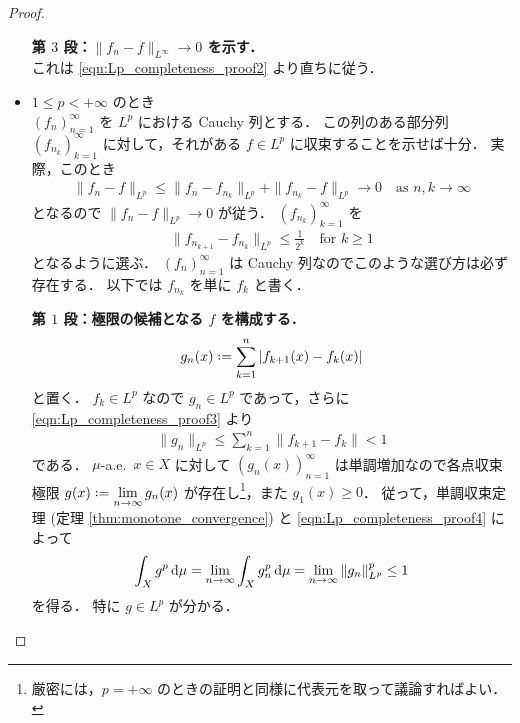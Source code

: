 \begin{proof}
\begin{itemize}[leftmargin=\parindent]
        \textbf{第 $3$ 段：$\|f_n-f\|_{L^\infty}\to0$ を示す．}\\
        これは \eqref{eqn:Lp_completeness_proof2} より直ちに従う．

    \item $1\le p<+\infty$ のとき\\
        $(f_n)_{n=1}^\infty$ を $L^p$ における Cauchy 列とする．
        この列のある部分列 $(f_{n_k})_{k=1}^\infty$ に対して，それがある $f\in L^p$ に収束することを示せば十分．
        実際，このとき
        \begin{align*}
            \|f_n-f\|_{L^p}
            \le\|f_n-f_{n_k}\|_{L^p}+\|f_{n_k}-f\|_{L^p}
            \to0\quad\text{as $n,k\to\infty$}
        \end{align*}
        となるので $\|f_n-f\|_{L^p}\to0$ が従う．
        $(f_{n_k})_{k=1}^\infty$ を
        \begin{align}
            \|f_{n_{k+1}}-f_{n_k}\|_{L^p}\le\frac{1}{2^k}\quad\text{for $k\ge1$}
            \label{eqn:Lp_completeness_proof3}
        \end{align}
        となるように選ぶ．
        $(f_n)_{n=1}^\infty$ は Cauchy 列なのでこのような選び方は必ず存在する．
        以下では $f_{n_k}$ を単に $f_k$ と書く．

        \textbf{第 $1$ 段：極限の候補となる $f$ を構成する．}
        \begin{align*}
            g_n(x)\defeq\sum_{k=1}^n|f_{k+1}(x)-f_k(x)|
        \end{align*}
        と置く．
        $f_k\in L^p$ なので $g_n\in L^p$ であって，さらに \eqref{eqn:Lp_completeness_proof3} より
        \begin{align}
            \|g_n\|_{L^p}\le\sum_{k=1}^n\|f_{k+1}-f_k\|<1
            \label{eqn:Lp_completeness_proof4}
        \end{align}
        である．
        $\mu$-a.e.\ $x\in X$ に対して $(g_n(x))_{n=1}^\infty$ は単調増加なので各点収束極限
        $\displaystyle g(x)\defeq\lim_{n\to\infty}g_n(x)$ が存在し\footnote{
            厳密には，$p=+\infty$ のときの証明と同様に代表元を取って議論すればよい．
        }，また $g_1(x)\ge0$．
        従って，単調収束定理 (定理 \ref{thm:monotone_convergence}) と \eqref{eqn:Lp_completeness_proof4} によって
        \begin{align*}
            \int_Xg^p\,\mathrm{d}\mu
            =\lim_{n\to\infty}\int_Xg_n^p\,\mathrm{d}\mu
            =\lim_{n\to\infty}\|g_n\|_{L^p}^p
            \le1
        \end{align*}
        を得る．
        特に $g\in L^p$ が分かる．


\end{itemize}
\end{proof}
